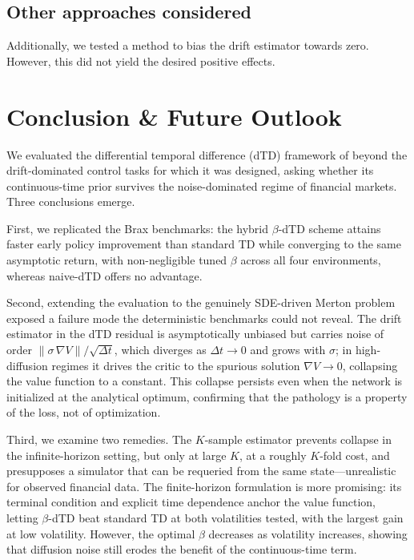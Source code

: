 \documentclass{article}
\begin{document}
\subsection{Other approaches considered}
Additionally, we tested a method to bias the drift estimator towards zero. However, this did not yield the desired positive effects.


\section{Conclusion \& Future Outlook}
\label{sec:conclusion}

We evaluated the differential temporal difference (dTD) framework of \citet{settai2025} beyond the drift-dominated control tasks for which it was designed, asking whether its continuous-time prior survives the noise-dominated regime of financial markets. Three conclusions emerge.

First, we replicated the Brax benchmarks: the hybrid $\beta$-dTD scheme attains faster early policy improvement than standard TD while converging to the same asymptotic return, with non-negligible tuned $\beta$ across all four environments, whereas naive-dTD offers no advantage.

Second, extending the evaluation to the genuinely SDE-driven Merton problem exposed a failure mode the deterministic benchmarks could not reveal. The drift estimator in the dTD residual is asymptotically unbiased but carries noise of order $\|\sigma\,\nabla V\|/\sqrt{\Delta t}$, which diverges as $\Delta t \to 0$ and grows with $\sigma$; in high-diffusion regimes it drives the critic to the spurious solution $\nabla V \to 0$, collapsing the value function to a constant. This collapse persists even when the network is initialized at the analytical optimum, confirming that the pathology is a property of the loss, not of optimization.

Third, we examine two remedies. The $K$-sample estimator prevents collapse in the infinite-horizon setting, but only at large $K$, at a roughly $K$-fold cost, and presupposes a simulator that can be requeried from the same state---unrealistic for observed financial data. The finite-horizon formulation is more promising: its terminal condition and explicit time dependence anchor the value function, letting $\beta$-dTD beat standard TD at both volatilities tested, with the largest gain at low volatility. However, the optimal $\beta$ decreases as volatility increases, showing that diffusion noise still erodes the benefit of the continuous-time term.
\end{document}

